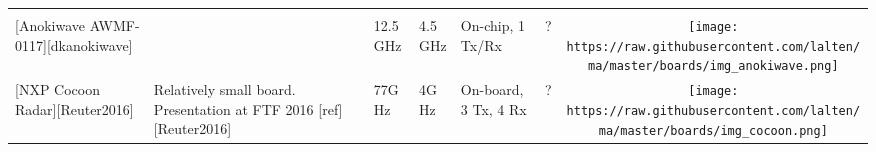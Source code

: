 \begin{longtable}[]{@{}llllllc@{}}
\begin{minipage}[t]{0.10\columnwidth}
\strut
\end{minipage}\tabularnewline
\begin{minipage}[t]{0.09\columnwidth}\raggedright\strut
{[}Anokiwave AWMF-0117{]}{[}dkanokiwave{]}\strut
\end{minipage} & \begin{minipage}[t]{0.13\columnwidth}\raggedright\strut
\strut
\end{minipage} & \begin{minipage}[t]{0.09\columnwidth}\raggedright\strut
12.5GHz\strut
\end{minipage} & \begin{minipage}[t]{0.11\columnwidth}\raggedright\strut
4.5GHz\strut
\end{minipage} & \begin{minipage}[t]{0.10\columnwidth}\raggedright\strut
On-chip, 1 Tx/Rx\strut
\end{minipage} & \begin{minipage}[t]{0.15\columnwidth}\raggedright\strut
?\strut
\end{minipage} & \begin{minipage}[t]{0.10\columnwidth}\centering\strut
\texttt{[image: https://raw.githubusercontent.com/lalten/ma/master/boards/img\_anokiwave.png]}\strut
\end{minipage}\tabularnewline
\begin{minipage}[t]{0.09\columnwidth}\raggedright\strut
{[}NXP Cocoon Radar{]}{[}Reuter2016{]}\strut
\end{minipage} & \begin{minipage}[t]{0.13\columnwidth}\raggedright\strut
Relatively small board. Presentation at FTF 2016
{[}ref{]}{[}Reuter2016{]}\strut
\end{minipage} & \begin{minipage}[t]{0.09\columnwidth}\raggedright\strut
77GHz\strut
\end{minipage} & \begin{minipage}[t]{0.11\columnwidth}\raggedright\strut
4GHz\strut
\end{minipage} & \begin{minipage}[t]{0.10\columnwidth}\raggedright\strut
On-board, 3 Tx, 4 Rx\strut
\end{minipage} & \begin{minipage}[t]{0.15\columnwidth}\raggedright\strut
?\strut
\end{minipage} & \begin{minipage}[t]{0.10\columnwidth}\centering\strut
\texttt{[image: https://raw.githubusercontent.com/lalten/ma/master/boards/img\_cocoon.png]}\strut

\end{minipage}
\end{longtable}
